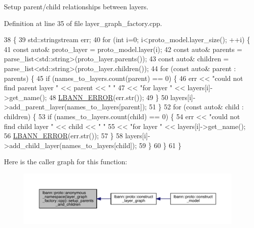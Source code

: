 Setup parent/child relationships between layers. 

Definition at line 35 of file layer\+\_\+graph\+\_\+factory.\+cpp.


\begin{DoxyCode}
38                                                                     \{
39   std::stringstream err;
40   \textcolor{keywordflow}{for} (\textcolor{keywordtype}{int} i=0; i<proto\_model.layer\_size(); ++i) \{
41     \textcolor{keyword}{const} \textcolor{keyword}{auto}& proto\_layer = proto\_model.layer(i);
42     \textcolor{keyword}{const} \textcolor{keyword}{auto}& parents = parse\_list<std::string>(proto\_layer.parents());
43     \textcolor{keyword}{const} \textcolor{keyword}{auto}& children = parse\_list<std::string>(proto\_layer.children());
44     \textcolor{keywordflow}{for} (\textcolor{keyword}{const} \textcolor{keyword}{auto}& parent : parents) \{
45       \textcolor{keywordflow}{if} (names\_to\_layers.count(parent) == 0) \{
46         err << \textcolor{stringliteral}{"could not find parent layer "} << parent << \textcolor{stringliteral}{" "} 
47             << \textcolor{stringliteral}{"for layer "} << layers[i]->get\_name();
48         \hyperlink{base_8hpp_a80b1d707117e968a6951b7222e4b2b87}{LBANN\_ERROR}(err.str());
49       \}
50       layers[i]->add\_parent\_layer(names\_to\_layers[parent]);
51     \}
52     \textcolor{keywordflow}{for} (\textcolor{keyword}{const} \textcolor{keyword}{auto}& child : children) \{
53       \textcolor{keywordflow}{if} (names\_to\_layers.count(child) == 0) \{
54         err << \textcolor{stringliteral}{"could not find child layer "} << child << \textcolor{stringliteral}{" "} 
55             << \textcolor{stringliteral}{"for layer "} << layers[i]->get\_name();
56         \hyperlink{base_8hpp_a80b1d707117e968a6951b7222e4b2b87}{LBANN\_ERROR}(err.str());
57       \}
58       layers[i]->add\_child\_layer(names\_to\_layers[child]);
59     \}
60   \}
61 \}
\end{DoxyCode}
Here is the caller graph for this function\+:\nopagebreak
\begin{figure}[H]
\begin{center}
\leavevmode
\includegraphics[width=350pt]{namespacelbann_1_1proto_1_1anonymous__namespace_02layer__graph__factory_8cpp_03_abbebb0b2e6ba1befb14b0b790eac96a0_icgraph}
\end{center}
\end{figure}
